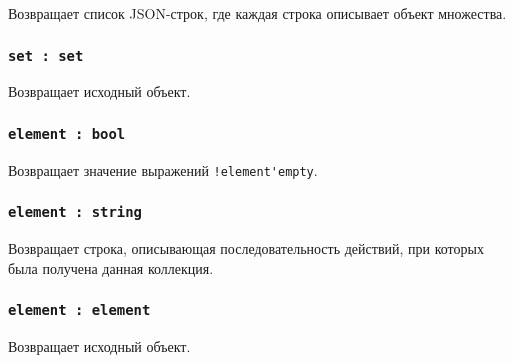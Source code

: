 Возвращает список JSON-строк, где каждая строка описывает объект множества.

\subsubsection{\lstinline|set : set|}

Возвращает исходный объект.

\subsubsection{\lstinline|element : bool|}

Возвращает значение выражений \lstinline|!element'empty|.

\subsubsection{\lstinline|element : string|}

Возвращает строка, описывающая последовательность действий, при которых была получена данная коллекция.

\subsubsection{\lstinline|element : element|}

Возвращает исходный объект.
